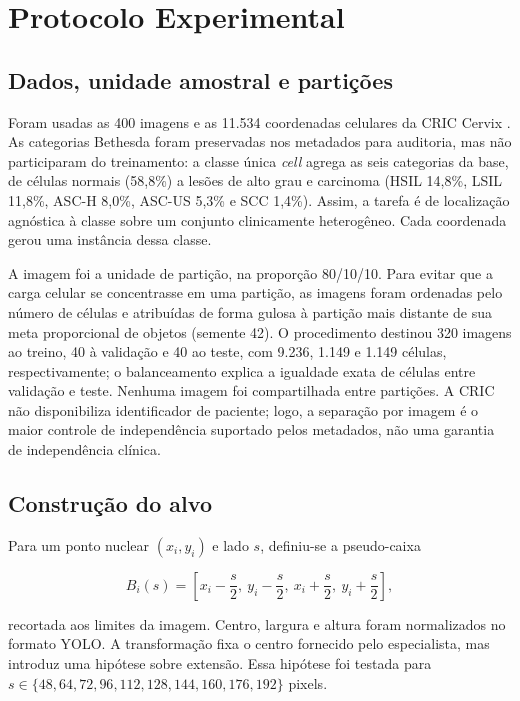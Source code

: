 ﻿\FloatBarrier
\section{Protocolo Experimental}

\subsection{Dados, unidade amostral e parti\c{c}\~oes}

Foram usadas as 400 imagens e as 11.534 coordenadas celulares da CRIC Cervix
\cite{rezende2021cric}. As categorias Bethesda foram preservadas nos metadados
para auditoria, mas n\~ao participaram do treinamento: a classe \'unica
\textit{cell} agrega as seis categorias da base, de c\'elulas normais (58,8\%) a
les\~oes de alto grau e carcinoma (HSIL 14,8\%, LSIL 11,8\%, ASC-H 8,0\%, ASC-US
5,3\% e SCC 1,4\%). Assim, a tarefa \'e de localiza\c{c}\~ao agn\'ostica \`a classe
sobre um conjunto clinicamente heterog\^eneo. Cada coordenada gerou uma inst\^ancia
dessa classe.

A imagem foi a unidade de parti\c{c}\~ao, na propor\c{c}\~ao 80/10/10. Para
evitar que a carga celular se concentrasse em uma parti\c{c}\~ao, as imagens
foram ordenadas pelo n\'umero de c\'elulas e atribu\'idas de forma gulosa \`a
parti\c{c}\~ao mais distante de sua meta proporcional de objetos (semente 42). O
procedimento destinou 320 imagens ao treino, 40 \`a valida\c{c}\~ao e 40 ao teste,
com 9.236, 1.149 e 1.149 c\'elulas, respectivamente; o balanceamento explica a
igualdade exata de c\'elulas entre valida\c{c}\~ao e teste. Nenhuma imagem foi
compartilhada entre parti\c{c}\~oes. A CRIC n\~ao disponibiliza identificador de
paciente; logo, a separa\c{c}\~ao por imagem \'e o maior controle de independ\^encia
suportado pelos metadados, n\~ao uma garantia de independ\^encia cl\'inica.

\subsection{Constru\c{c}\~ao do alvo}

Para um ponto nuclear $(x_i,y_i)$ e lado $s$, definiu-se a pseudo-caixa

\begin{equation}
B_i(s)=\left[x_i-\frac{s}{2},\ y_i-\frac{s}{2},\ x_i+\frac{s}{2},\ y_i+\frac{s}{2}\right],
\label{eq:pseudobox}
\end{equation}

recortada aos limites da imagem. Centro, largura e altura foram normalizados no
formato YOLO. A transforma\c{c}\~ao fixa o centro fornecido pelo especialista,
mas introduz uma hip\'otese sobre extens\~ao. Essa hip\'otese foi testada para
$s\in\{48,64,72,96,112,128,144,160,176,192\}$ pixels.

